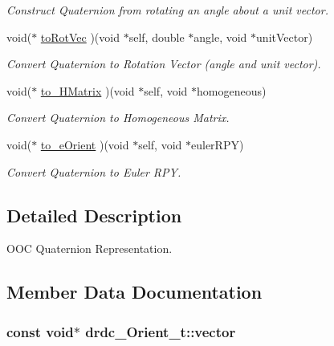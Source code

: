 \begin{CompactItemize}
\begin{CompactList}\small\item\em Construct Quaternion from rotating an angle about a unit vector. \item\end{CompactList}\item 
void($\ast$ \hyperlink{structdrdc__Orient__t_12f7b4fd36f95a7aaf65c938c2ade0ca}{toRotVec} )(void $\ast$self, double $\ast$angle, void $\ast$unitVector)
\begin{CompactList}\small\item\em Convert Quaternion to Rotation Vector (angle and unit vector). \item\end{CompactList}\item 
void($\ast$ \hyperlink{structdrdc__Orient__t_b491fbe468cbc5c75e372ffe0e0a632f}{to\_\-HMatrix} )(void $\ast$self, void $\ast$homogeneous)
\begin{CompactList}\small\item\em Convert Quaternion to Homogeneous Matrix. \item\end{CompactList}\item 
void($\ast$ \hyperlink{structdrdc__Orient__t_900b9c9b0a700211ad1305f9eeb89dc0}{to\_\-eOrient} )(void $\ast$self, void $\ast$eulerRPY)
\begin{CompactList}\small\item\em Convert Quaternion to Euler RPY. \item\end{CompactList}\end{CompactItemize}


\subsection{Detailed Description}
OOC Quaternion Representation. 



\subsection{Member Data Documentation}
\hypertarget{structdrdc__Orient__t_1c7f7a1cc0c16797a0f7fbce6d3b1c99}{
\subsubsection[vector]{\setlength{\rightskip}{0pt plus 5cm}const void$\ast$ {\bf drdc\_\-Orient\_\-t::vector}}}
\label{structdrdc__Orient__t_1c7f7a1cc0c16797a0f7fbce6d3b1c99}


